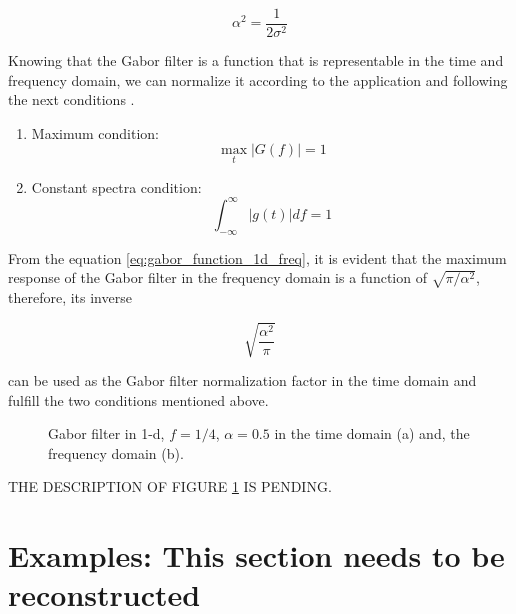 \begin{equation}\label{eq:gabor_spread_1d}
    \alpha^2 = \frac{1}{2 \sigma^{2} }
\end{equation}

Knowing that the Gabor filter is a function that is representable in the time and frequency domain, we can normalize it according to the application and following the next conditions \cite{Boukerroui.Noble.ea:JMIV:2004}.

\begin{enumerate}
    \item Maximum condition:
        \begin{equation}\label{eq:maximun_condition}
            \max_t{|G(f)|} = 1
        \end{equation}
    \item Constant spectra condition:
        \begin{equation}\label{eq:constant_energy_condition}
            \int_{-\infty}^{\infty} |g(t)| df = 1
        \end{equation}        
\end{enumerate}

From the equation \eqref{eq:gabor_function_1d_freq}, it is evident that the maximum response of the Gabor filter in the frequency domain is a function of $\sqrt{\pi/\alpha^2}$, therefore, its inverse

\begin{equation}\label{eq:normalization_factor}
    \sqrt{\frac{\alpha^2}{\pi}}
\end{equation}

can be used as the Gabor filter normalization factor in the time domain and fulfill the two conditions mentioned above. 

\begin{figure}
	\centering
\caption{Gabor filter in 1-d, $f =1/4$, $\alpha=0.5$ in the time domain (a) and, the frequency domain (b).}\label{fig:Gabor_filter_time_freq_norm}
\end{figure}

THE DESCRIPTION OF FIGURE \ref{fig:Gabor_filter_time_freq_norm} IS PENDING.

\section{Examples: This section needs to be reconstructed}

